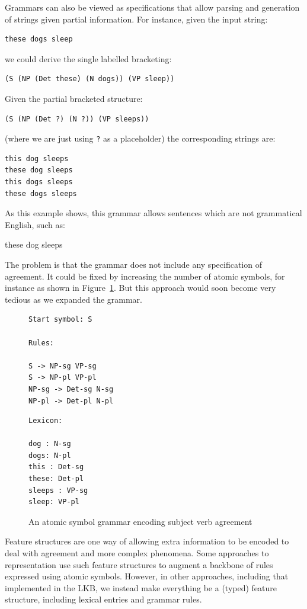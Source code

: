\documentclass[12pt]{report}
\begin{document}
Grammars can also be viewed as specifications that allow
parsing and generation of strings given partial information.
For instance, given the input string:
\begin{verbatim}
these dogs sleep
\end{verbatim}
we could derive the single labelled bracketing:
\begin{verbatim}
(S (NP (Det these) (N dogs)) (VP sleep))
\end{verbatim}
Given the partial bracketed structure:
\begin{verbatim}
(S (NP (Det ?) (N ?)) (VP sleeps))
\end{verbatim}
(where we are just using {\tt ?}
as a placeholder) the corresponding strings are:
\begin{verbatim}
this dog sleeps
these dog sleeps
this dogs sleeps
these dogs sleeps
\end{verbatim}

As this example shows, this grammar allows
sentences which are not grammatical English, such as:
\begin{ex}
these dog sleeps
\end{ex}
The problem is that the grammar does not include any specification of
agreement.  It could be fixed by increasing the number of atomic symbols,
for instance as shown in Figure~\ref{agratomic}.
But this approach
would soon become very tedious as we expanded the grammar.
\begin{figure}[!ht]
{\small
\begin{minipage}[t]{3in}
\begin{verbatim}
Start symbol: S

Rules:

S -> NP-sg VP-sg
S -> NP-pl VP-pl
NP-sg -> Det-sg N-sg
NP-pl -> Det-pl N-pl

\end{verbatim}
\end{minipage}
\begin{minipage}[t]{3in}
\begin{verbatim}
Lexicon:

dog : N-sg
dogs: N-pl
this : Det-sg
these: Det-pl
sleeps : VP-sg
sleep: VP-pl
\end{verbatim}
\end{minipage}}
\caption{An atomic symbol grammar encoding subject verb agreement}
\label{agratomic}
\end{figure}

Feature structures are one way of allowing extra information
to be encoded to
deal with agreement and more complex phenomena.  
Some approaches to representation use such feature structures
to augment a backbone of rules expressed using atomic symbols.
However, in other approaches, including that implemented in the
LKB, we instead make everything be a 
(typed) feature structure, including lexical entries
and grammar rules.  
\end{document}

